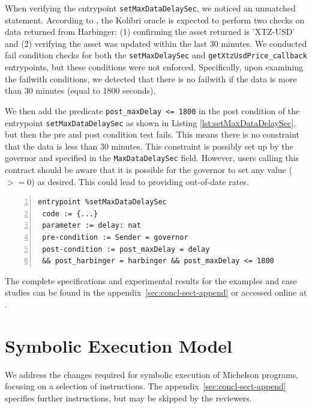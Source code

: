 \documentclass[runningheads]{llncs}
\begin{document}
When verifying the entrypoint \lstinline/setMaxDataDelaySec/, we noticed an unmatched statement. According to \cite{kolibri}, the Kolibri oracle is expected to perform two checks on data returned from Harbinger: (1) confirming the asset returned is 'XTZ-USD' and (2) verifying the asset was updated within the last 30 minutes. We conducted fail condition checks for both the \lstinline/setMaxDelaySec/ and \lstinline/getXtzUsdPrice_callback/ entrypoints, but these conditions were not enforced. Specifically, upon examining the failwith conditions, we detected that there is no failwith if the data is more than 30 minutes (equal to 1800 seconds). 

We then add the predicate \lstinline/post_maxDelay <= 1800/ in the post condition of the entrypoint \lstinline/setMaxDataDelaySec/ as shown in Listing \ref{lst:setMaxDataDelaySec}, but then the pre and post condition test fails. This means there is no constraint that the data is less than 30 minutes. This constraint is possibly set up by the governor and specified in the \lstinline/MaxDataDelaySec/ field. However, users calling this contract should be aware that it is possible for the governor to set any value ($>=0$) as desired. This could lead to providing out-of-date rates.

\begin{lstlisting}[float=tp,captionpos=b,caption={The specification of the setMaxDataDelaySec entrypoint},label={lst:setMaxDataDelaySec},numbers=left]
entrypoint %setMaxDataDelaySec
 code := {...}
 parameter := delay: nat
 pre-condition := Sender = governor            
 post-condition := post_maxDelay = delay 
 && post_harbinger = harbinger && post_maxDelay <= 1800
\end{lstlisting}

The complete specifications and experimental results for the examples and case studies can be found in the appendix~\ref{sec:concl-sect-append} or accessed online at \cite{}.
\section{Symbolic Execution Model}
\label{sec:symbolic-execution-model} 
We address the changes required for symbolic execution of Michelson programs, focusing on a selection of instructions. The
appendix~\ref{sec:concl-sect-append} specifies further instructions,
but may be skipped by the reviewers.
\end{document}
